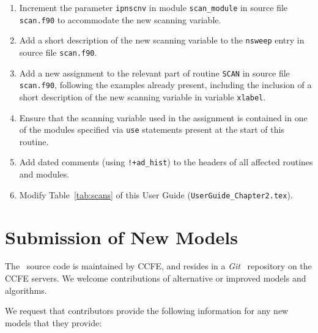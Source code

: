 \begin{enumerate}

\item Increment the parameter \texttt{ipnscnv} in module \texttt{scan\_module}
  in source file \texttt{scan.f90} to accommodate the new scanning variable.

\item Add a short description of the new scanning variable to the
  \texttt{nsweep} entry in source file \texttt{scan.f90}.

\item Add a new assignment to the relevant part of routine \texttt{SCAN} in
  source file \texttt{scan.f90}, following the examples already present,
  including the inclusion of a short description of the new scanning variable
  in variable \texttt{xlabel}.

\item Ensure that the scanning variable used in the assignment is contained in
  one of the modules specified via \texttt{use} statements present at the
  start of this routine.

\item Add dated comments (using \verb.!+ad_hist.) to the headers of
  all affected routines and modules.

\item Modify Table~\ref{tab:scans} of this User Guide
  (\texttt{UserGuide\_Chapter2.tex}).


\end{enumerate}

\section{Submission of New Models}

The \process\ source code is maintained by CCFE, and resides in a
\textit{Git}~\cite{git} repository on the CCFE servers. We welcome
contributions of alternative or improved models and algorithms.

We request that contributors provide the following information for any new models that they provide:

